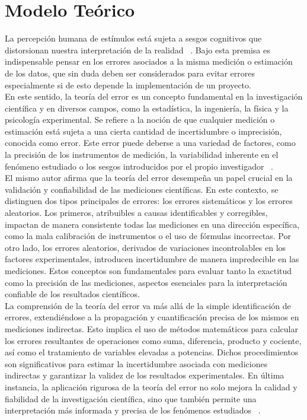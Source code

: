 \documentclass[runningheads]{llncs}
\begin{document}
    \section*{\centering Modelo Teórico}
    La percepción humana de estímulos está sujeta a sesgos cognitivos que distorsionan nuestra interpretación de la realidad ~\cite{Firestone_article}. Bajo esta premisa es indispensable pensar en los errores asociados a la misma medición o estimación de los datos, que sin duda deben ser considerados para evitar errores especialmente si de esto depende la implementación de un proyecto. \\
    En este sentido, la teoría del error es un concepto fundamental en la investigación científica y en diversos campos, como la estadística, la ingeniería, la física y la psicología experimental. Se refiere a la noción de que cualquier medición o estimación está sujeta a una cierta cantidad de incertidumbre o imprecisión, conocida como error. 
    Este error puede deberse a una variedad de factores, como la precisión de los instrumentos de medición, la variabilidad inherente en el fenómeno estudiado o los sesgos introducidos por el propio investigador ~\cite{Gonzalez}.\\
    El mismo autor afirma que la teoría del error desempeña un papel crucial en la validación y confiabilidad de las mediciones científicas. En este contexto, se distinguen dos tipos principales de errores: los errores sistemáticos y los errores aleatorios. Los primeros, atribuibles a causas identificables y corregibles, impactan de manera consistente todas las mediciones en una dirección específica, como la mala calibración de instrumentos o el uso de fórmulas incorrectas. Por otro lado, los errores aleatorios, derivados de variaciones incontrolables en los factores experimentales, introducen incertidumbre de manera impredecible en las mediciones. Estos conceptos son fundamentales para evaluar tanto la exactitud como la precisión de las mediciones, aspectos esenciales para la interpretación confiable de los resultados científicos.\\
    La comprensión de la teoría del error va más allá de la simple identificación de errores, extendiéndose a la propagación y cuantificación precisa de los mismos en mediciones indirectas. Esto implica el uso de métodos matemáticos para calcular los errores resultantes de operaciones como suma, diferencia, producto y cociente, así como el tratamiento de variables elevadas a potencias. Dichos procedimientos son significativos para estimar la incertidumbre asociada con mediciones indirectas y garantizar la validez de los resultados experimentales. En última instancia, la aplicación rigurosa de la teoría del error no solo mejora la calidad y fiabilidad de la investigación científica, sino que también permite una interpretación más informada y precisa de los fenómenos estudiados ~\cite{Medina}.\\
    
\end{document}

